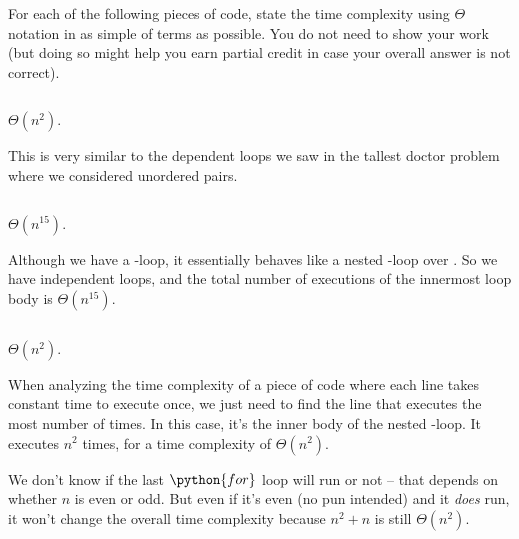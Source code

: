 \begin{prob}
    For each of the following pieces of code, state the time complexity using
    $\Theta$ notation in as simple of terms as possible. You do not need to
    show your work (but doing so might help you earn partial credit in case your
    overall answer is not correct).

    \begin{subprobset}

        \begin{subprob}
            \inputminted{python}{\thisdir/include/part_a.py}

            \begin{soln}
                $\Theta(n^2)$.

                This is very similar to the dependent loops we saw in the
                tallest doctor problem where we considered unordered pairs.
            \end{soln}
        \end{subprob}

        \begin{subprob}
            \inputminted{python}{\thisdir/include/part_b.py}

            \begin{soln}
                $\Theta(n^15)$.

                Although we have a -loop, it essentially
                behaves like a nested -loop over .
                So we have independent loops, and the total number of executions
                of the innermost loop body is $\Theta(n^15)$.
            \end{soln}
        \end{subprob}

        \begin{subprob}
            \inputminted{python}{\thisdir/include/part_c.py}

            \begin{soln}
                $\Theta(n^2)$.

                When analyzing the time complexity of a piece of code where
                each line takes constant time to execute once, we just need to find the line
                that executes the most number of times. In this case, it's the
                inner body of the nested -loop. It executes $n^2$ times, for
                a time complexity of $\Theta(n^2)$.

                We don't know if the last $\python{for}$ loop will run or not
                -- that depends on whether $n$ is even or odd. But even if it's
                even (no pun intended) and it \emph{does} run, it won't change
                the overall time complexity because $n^2 + n$ is still
                $\Theta(n^2)$.
            \end{soln}
        \end{subprob}


\end{subprobset}
\end{prob}
